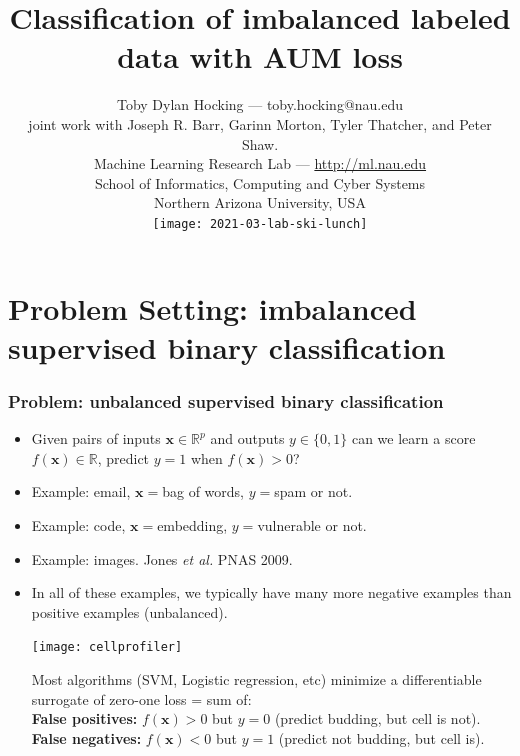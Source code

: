 \documentclass[t]{beamer}
\begin{document}
\title{Classification of imbalanced labeled data with AUM loss}

\author{
  Toby Dylan Hocking --- toby.hocking@nau.edu\\
  joint work with Joseph R. Barr, Garinn Morton, Tyler Thatcher, and Peter Shaw.\\
  Machine Learning Research Lab --- \url{http://ml.nau.edu}\\
  School of Informatics, Computing and Cyber Systems\\
  Northern Arizona University, USA\\
  \texttt{[image: 2021-03-lab-ski-lunch]} \\
}

\date{}

\maketitle

\section{Problem Setting: imbalanced supervised  binary classification}

\begin{frame}
  \frametitle{Problem: unbalanced supervised binary classification}
  
  \begin{itemize}
  \item Given pairs of inputs $\mathbf x\in\mathbb R^p$ and outputs
    $y\in\{0,1\}$ can we learn a score 
    $f(\mathbf x)\in\mathbb R$, predict $y=1$ when $f(\mathbf x)>0$?
  \item Example: email, $\mathbf x =$bag of words, $y=$spam or not.
  \item Example: code, $\mathbf x =$embedding, $y=$vulnerable or not.
  \item Example: images. Jones {\it et al.} PNAS 2009.
  \item In all of these examples, we typically have many more negative
    examples than positive examples (unbalanced).
    \parbox{2in}{\texttt{[image: cellprofiler]}}
    \parbox{1.9in}{Most algorithms (SVM, Logistic regression, etc) minimize a differentiable surrogate of zero-one loss = sum of:\\
      \textbf{False positives:} $f(\mathbf x)>0$ but $y=0$ (predict
      budding, but cell is not).\\
      \textbf{False negatives:} $f(\mathbf x)<0$ but $y=1$ (predict
      not budding, but cell is).  }
  \end{itemize} 
\end{frame}
\end{document}
